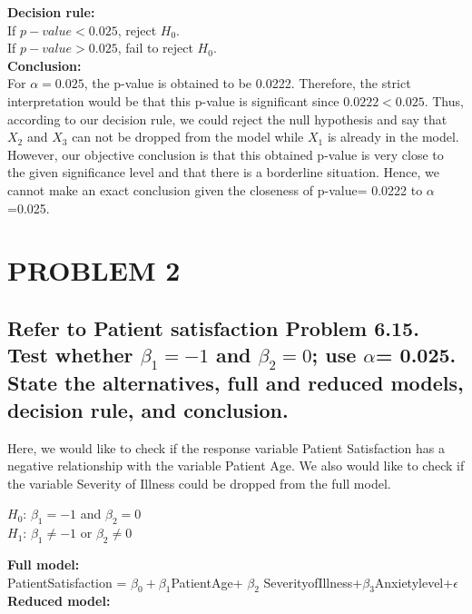 \documentclass[a4paper,9pt]{article}\usepackage[]{graphicx}\usepackage[]{color}
\begin{document}
\newpage

\textbf{Decision rule:} \\

If $p-value<0.025$, reject $H_0$. \\
If $p-value>0.025$, fail to reject $H_0$.\\

\textbf {Conclusion:}\\

For $\alpha=0.025$, the p-value is obtained to be 0.0222. Therefore, the strict interpretation would be that this p-value is significant since  $0.0222<0.025$. Thus, according to our decision rule, we could reject the null hypothesis and say that $X_2$ and $X_3$ can not be dropped from the model while $X_1$ is already in the model. However, our objective conclusion is that this obtained p-value is very close to the given significance level and that there is a borderline situation. Hence, we cannot make an exact conclusion given the closeness of p-value= 0.0222 to $\alpha$=0.025. 


\section*{PROBLEM 2}
\subsection*{Refer to Patient satisfaction Problem 6.15. Test whether 
$\beta_1 = -1$ and $\beta_2 = 0$; use $\alpha$= 0.025. State the alternatives, full and reduced models, decision rule, and conclusion.}


Here, we would like to check if the response variable Patient Satisfaction has a negative relationship with the variable Patient Age. We also would like to check if the variable Severity of Illness could be dropped from the full model.\\
\begin{center}
$H_0$: $\beta_1=-1$ and $\beta_2=0$ \\
$H_1$: $\beta_1\neq -1$ or $\beta_2\neq 0$\\
\end{center} 

\textbf{Full model:}\\

PatientSatisfaction = $\beta_0+\beta_1$PatientAge+ $\beta_2$ SeverityofIllness+$\beta_3$Anxietylevel+$\epsilon$ \\

\textbf{Reduced model:}\\
\end{document}
